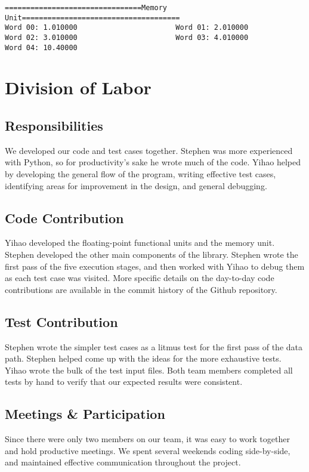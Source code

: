 \documentclass[12pt]{article}
\begin{document}
\begin{verbatim}
================================Memory Unit=====================================
Word 00: 1.010000                       Word 01: 2.010000                       
Word 02: 3.010000                       Word 03: 4.010000                       
Word 04: 10.40000
\end{verbatim}

\section{Division of Labor}
\subsection{Responsibilities}
We developed our code and test cases together.  Stephen was more experienced with Python, so for productivity's sake he wrote much of the code.  Yihao helped by developing the general flow of the program, writing effective test cases, identifying areas for improvement in the design, and general debugging.

\subsection{Code Contribution}
Yihao developed the floating-point functional units and the memory unit.  Stephen developed the other main components of the library.  Stephen wrote the first pass of the five execution stages, and then worked with Yihao to debug them as each test case was visited.  More specific details on the day-to-day code contributions are available in the commit history of the Github repository.

\subsection{Test Contribution}
Stephen wrote the simpler test cases as a litmus test for the first pass of the data path.  Stephen helped come up with the ideas for the more exhaustive tests.  Yihao wrote the bulk of the test input files.  Both team members completed all tests by hand to verify that our expected results were consistent.

\subsection{Meetings \& Participation}
Since there were only two members on our team, it was easy to work together and hold productive meetings.  We spent several weekends coding side-by-side, and maintained effective communication throughout the project.
\end{document}
